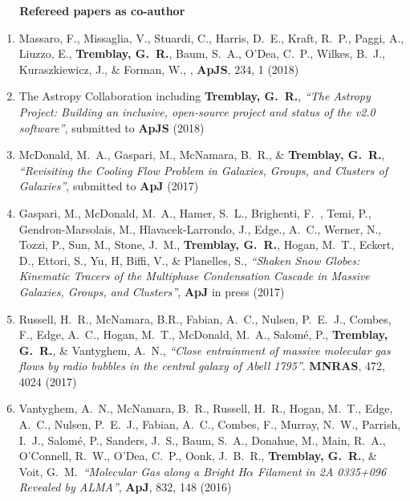 \documentclass[11pt]{article}
\begin{document}
\vspace{4mm}

\noindent \textbf{~~~Refereed papers as co-author}

\begin{enumerate}[resume]

\item Massaro, F., Missaglia, V., Stuardi, C., Harris, D.~E.,
Kraft, R.~P., Paggi, A., Liuzzo, E., \textbf{Tremblay, G.~R.},
Baum, S.~A., O'Dea, C.~P., Wilkes, B.~J., Kuraszkiewicz, J., \& Forman, W., , \textbf{ApJS}, 234, 1 (2018)


\item The Astropy Collaboration including \textbf{Tremblay, G.~R.}, \textit{``The Astropy Project: Building an inclusive,
open-source project and status of the v2.0 software''}, submitted to \textbf{ApJS} (2018)

\item McDonald, M.~A., Gaspari, M., McNamara, B.~R., \& \textbf{Tremblay, G.~R.}, \textit{``Revisiting the Cooling Flow Problem in Galaxies, Groups, and Clusters of Galaxies''}, submitted to \textbf{ApJ} (2017)

\item Gaspari, M., McDonald, M.~A.,
Hamer, S.~L., Brighenti, F.~, Temi, P., Gendron-Marsolais, M., Hlavacek-Larrondo, J., Edge., A.~C.,
Werner, N., Tozzi, P., Sun, M.,
Stone, J.~M., \textbf{Tremblay, G.~R.}, Hogan, M.~T., Eckert, D.,
Ettori, S., Yu, H, Biffi, V.,
\& Planelles, S., \textit{``Shaken Snow Globes: Kinematic Tracers of the Multiphase Condensation
 Cascade in Massive Galaxies, Groups, and Clusters''}, \textbf{ApJ} in press (2017)

\item Russell, H.~R., McNamara, B.R., Fabian, A.~C., Nulsen, P.~E.~J., Combes, F., Edge, A.~C., Hogan, M.~T., McDonald, M.~A., Salom\'{e}, P.,
\textbf{Tremblay, G.~R.}, \& Vantyghem, A.~N., \textit{``Close entrainment of massive molecular gas flows by radio bubbles in the central galaxy of Abell 1795''}. \textbf{MNRAS}, 472, 4024 (2017)


\item Vantyghem, A.~N., McNamara, B.~R.,
Russell, H.~R., Hogan, M.~T., Edge, A.~C.,
Nulsen, P.~E.~J., Fabian, A.~C., Combes, F.,
Murray, N.~W., Parrish, I.~J., Salom\'{e}, P.,
Sanders, J.~S., Baum, S.~A., Donahue, M.,
Main, R.~A., O'Connell, R.~W., O'Dea, C.~P.,
Oonk, J.~B.~R., \textbf{Tremblay, G.~R.}, \& Voit, G.~M.\ \textit{``Molecular Gas along a Bright H$\alpha$ Filament in 2A 0335+096 Revealed by ALMA''}, \textbf{ApJ}, 832, 148 (2016)


\end{enumerate}
\end{document}
